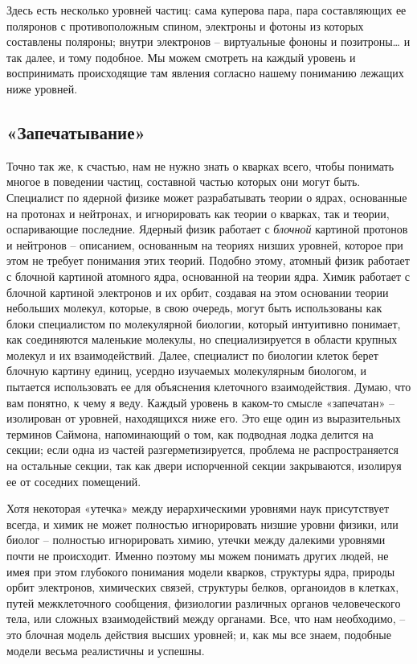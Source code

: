 \documentclass[../main.tex]{subfiles}
\begin{document}
Здесь есть несколько уровней частиц: сама куперова пара, пара составляющих ее поляронов с противоположным спином, электроны и фотоны из которых составлены поляроны; внутри электронов \--- виртуальные фононы и позитроны\ldots{} и так далее, и тому подобное. Мы можем смотреть на каждый уровень и воспринимать происходящие там явления согласно нашему пониманию лежащих ниже уровней.


\subsection{«Запечатывание»}

Точно так же, к счастью, нам не нужно знать о кварках всего, чтобы понимать многое в поведении частиц, составной частью которых они могут быть. Специалист по ядерной физике может разрабатывать теории о ядрах, основанные на протонах и нейтронах, и игнорировать как теории о кварках, так и теории, оспаривающие последние. Ядерный физик работает с \emph{блочной} картиной протонов и нейтронов \--- описанием, основанным на теориях низших уровней, которое при этом не требует понимания этих теорий. Подобно этому, атомный физик работает с блочной картиной атомного ядра, основанной на теории ядра. Химик работает с блочной картиной электронов и их орбит, создавая на этом основании теории небольших молекул, которые, в свою очередь, могут быть использованы как блоки специалистом по молекулярной биологии, который интуитивно понимает, как соединяются маленькие молекулы, но специализируется в области крупных молекул и их взаимодействий. Далее, специалист по биологии клеток берет блочную картину единиц, усердно изучаемых молекулярным биологом, и пытается использовать ее для объяснения клеточного взаимодействия. Думаю, что вам понятно, к чему я веду. Каждый уровень в каком-то смысле «запечатан» \--- изолирован от уровней, находящихся ниже его. Это еще один из выразительных терминов Саймона, напоминающий о том, как подводная лодка делится на секции; если одна из частей разгерметизируется, проблема не распространяется на остальные секции, так как двери испорченной секции закрываются, изолируя ее от соседних помещений.

Хотя некоторая «утечка» между иерархическими уровнями наук присутствует всегда, и химик не может полностью игнорировать низшие уровни физики, или биолог \--- полностью игнорировать химию, утечки между далекими уровнями почти не происходит. Именно поэтому мы можем понимать других людей, не имея при этом глубокого понимания модели кварков, структуры ядра, природы орбит электронов, химических связей, структуры белков, органоидов в клетках, путей межклеточного сообщения, физиологии различных органов человеческого тела, или сложных взаимодействий между органами. Все, что нам необходимо, \--- это блочная модель действия высших уровней; и, как мы все знаем, подобные модели весьма реалистичны и успешны.
\end{document}
